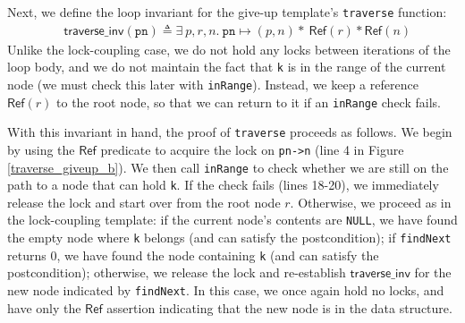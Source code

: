 \documentclass[sigplan,10pt,anonymous,review]{acmart}\settopmatter{printfolios=true,printccs=false,printacmref=false}
\newcommand{\infp}{\ensuremath{\mathsf{Ref }}}
\begin{document}

Next, we define the loop invariant for the give-up template's \texttt{traverse} function:
\begin{align*} &\mathsf{traverse\_inv}(\texttt{pn}) \triangleq \exists \ p, r, n.\ \texttt{pn} \mapsto (p, n) \ast \ \infp (r) \ast \infp (n)
\end{align*}
Unlike the lock-coupling case, we do not hold any locks between iterations of the loop body, and we do not maintain the fact that \lstinline{k} is in the range of the current node (we must check this later with \lstinline{inRange}). Instead, we keep a reference $\infp(r)$ to the root node, so that we can return to it if an \lstinline{inRange} check fails.

With this invariant in hand, the proof of \texttt{traverse} proceeds as follows. We begin by using the $\infp$ predicate to acquire the lock on \lstinline{pn->n} (line 4 in Figure \ref{traverse_giveup_b}). We then call \lstinline{inRange} to check whether we are still on the path to a node that can hold \lstinline{k}. If the check fails (lines 18-20), we immediately release the lock and start over from the root node $r$. Otherwise, we proceed as in the lock-coupling template: if the current node's contents are \texttt{NULL}, we have found the empty node where \texttt{k} belongs (and can satisfy the postcondition); if \texttt{findNext} returns 0, we have found the node containing \texttt{k} (and can satisfy the postcondition); otherwise, we release the lock and re-establish $\mathsf{traverse\_inv}$ for the new node indicated by \texttt{findNext}. In this case, we once again hold no locks, and have only the $\infp$ assertion indicating that the new node is in the data structure. %

\end{document}
